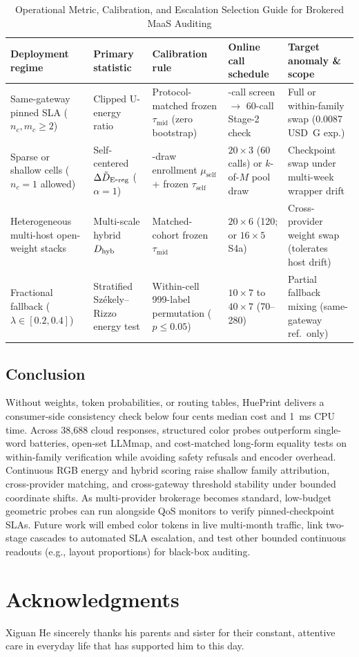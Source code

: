 \begin{table}[t]
\centering
\caption{Operational Metric, Calibration, and Escalation Selection Guide for Brokered MaaS Auditing}
\label{tab:deployment_guide}
\footnotesize\setlength{\tabcolsep}{3pt}\renewcommand{\arraystretch}{1.06}
\begin{tabular}{@{}>{\raggedright\arraybackslash}p{}>{\raggedright\arraybackslash}p{}>{\raggedright\arraybackslash}p{}>{\raggedright\arraybackslash}p{}>{\raggedright\arraybackslash}p{}@{}}
\toprule
Deployment regime & Primary statistic & Calibration rule & Online call schedule & Target anomaly \& scope \\
\midrule
Same-gateway pinned SLA ($n_c, m_c \ge 2$) & Clipped U-energy ratio & Protocol-matched frozen $\tau_{\mathrm{mid}}$ (zero bootstrap) & 30-call screen $\rightarrow$ 60-call Stage-2 check & Full or within-family swap (0.0087 USD~G exp.) \\
Sparse or shallow cells ($n_c = 1$ allowed) & Self-centered $\Delta\tilde D_{\mathrm{E\mbox{-}reg}}{}$ ($\alpha = 1$) & 256-draw enrollment $\mu_{\mathrm{self}}$ + frozen $\tau_{\mathrm{self}}$ & $20\times 3$ (60 calls) or $k$-of-$M$ pool draw & Checkpoint swap under multi-week wrapper drift \\
Heterogeneous multi-host open-weight stacks & Multi-scale hybrid $D_{\mathrm{hyb}}{}$ & Matched-cohort frozen $\tau_{\mathrm{mid}}$ & $20\times 6$ (120; or $16\times 5$ S4a) & Cross-provider weight swap (tolerates host drift) \\
Fractional fallback ($\lambda \in [0.2, 0.4]$) & Stratified Sz\'ekely--Rizzo energy test & Within-cell 999-label permutation ($p \le 0.05$) & $10\times 7$ to $40\times 7$ (70--280) & Partial fallback mixing (same-gateway ref.\ only) \\
\bottomrule
\end{tabular}
\end{table}

\subsection{Conclusion}
Without weights, token probabilities, or routing tables, HuePrint delivers a consumer-side consistency check below four cents median cost and 1~ms CPU time. Across 38,688 cloud responses, structured color probes outperform single-word batteries, open-set LLMmap, and cost-matched long-form equality tests on within-family verification while avoiding safety refusals and encoder overhead. Continuous RGB energy and hybrid scoring raise shallow family attribution, cross-provider matching, and cross-gateway threshold stability under bounded coordinate shifts. As multi-provider brokerage becomes standard, low-budget geometric probes can run alongside QoS monitors to verify pinned-checkpoint SLAs. Future work will embed color tokens in live multi-month traffic, link two-stage cascades to automated SLA escalation, and test other bounded continuous readouts (e.g., layout proportions) for black-box auditing.

\section*{Acknowledgments}
Xiguan He sincerely thanks his parents and sister for their constant, attentive care in everyday life that has supported him to this day.
